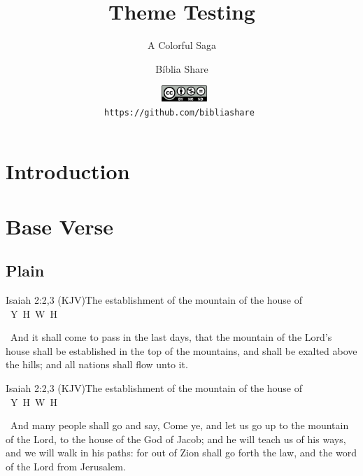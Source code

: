 \documentclass[12pt,aspectratio=169]{beamer}
\title{Theme Testing}
\subtitle{A Colorful Saga}
\author{Bíblia Share}
\date[{\tiny\tt https://github.com/bibliashare}]{{\scriptsize\tt%
    \includegraphics[height=6.0mm]{res/cc/by-nc-nd-88x31.pdf}\\[\smallskipamount]
    https://github.com/bibliashare
}}
\newcommand{\YA}{%
    \mbox{%
        Y\makebox[0pt][l]{\hspace{-0.178em}\raisebox{-0.00ex}{\scalebox{0.30}{E}}}%
        H\makebox[0pt][l]{\hspace{-0.010em}\raisebox{-0.00ex}{\scalebox{0.30}{O}}}%
        W\makebox[0pt][l]{\hspace{-0.245em}\raisebox{-0.00ex}{\scalebox{0.30}{A}}}%
        H%
    }%
}
\newcommand{\ver}[1]{%
    \raisebox{0.50ex}{%
        \scalebox{1.1}{%
            \pmb{\textbf{\textcolor{BSpbg}{#1}}}%
        }%
    }%
}
\newcommand{\QUOTE}[1]{%
    \par\noindent\hspace*{0.1\linewidth}%
    \begin{minipage}{0.8\linewidth}%
        \linespread{1.35}\large{#1}%
    \end{minipage}%
}
\begin{document}
    \begin{frame}
        \titlepage
    \end{frame}
    \section{Introduction}
    \section{Base Verse}
    \subsection{Plain}

    \begin{frame}{Isaiah 2:2,3 (KJV)}{The establishment of the mountain of the house of \YA}
        \QUOTE{%
            \ver{2}~And it shall come to pass in the last days, that the mountain of the
            Lord's house shall be established in the top of the mountains, and shall  be
            exalted above the hills; and all nations shall flow unto it.
        }
    \end{frame}

    \begin{frame}{Isaiah 2:2,3 (KJV)}{The establishment of the mountain of the house of \YA}
        \QUOTE{%
            \ver{3}~And many people shall go and say, Come ye, and let us go up  to  the
            mountain of the Lord, to the house of the God of Jacob; and he will teach us
            of his ways, and we will walk in his paths: for out of Zion shall  go  forth
            the law, and the word of the Lord from Jerusalem.
        }
    \end{frame}
\end{document}
